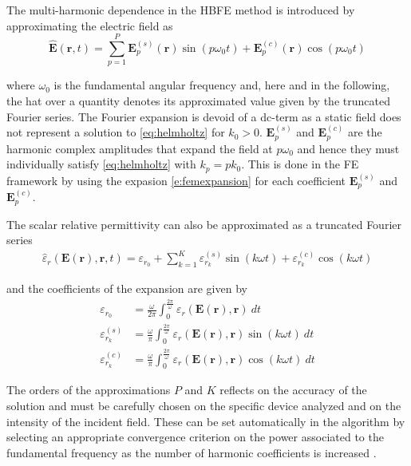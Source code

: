 \documentclass[journal]{IEEEtran}
\renewcommand{\vec}[1]{\mathbf{#1}}
\begin{document}

The multi-harmonic dependence in the HBFE method is introduced by approximating
the electric field as \cite{Bachinger2005}
%
\begin{equation} \label{eq:field}
\vec{\hat{E}}(\vec{r}, t) = \sum^P_{p=1} \vec{E}_{p}^{(s)}(\vec{r}) \sin(p
\omega_0 t) + \vec{E}_p^{(c)}(\vec{r}) \cos(p \omega_0 t)
\end{equation} 

\noindent where $\omega_0$ is the fundamental angular frequency and, here and in
the following, the hat over a quantity denotes its approximated value given by
the truncated Fourier series. The Fourier expansion is devoid of a dc-term as a
static field does not represent a solution to \eqref{eq:helmholtz} for $k_0 >
0$. $\vec{E}_{p}^{(s)}$ and $\vec{E}_{p}^{(c)}$ are the harmonic complex
amplitudes that expand the field at $p\omega_0$ and hence they must individually
satisfy \eqref{eq:helmholtz} with $k_p=pk_0$. This is done in the FE framework
by using the expasion \eqref{e:femexpansion} for each coefficient $\vec{E}_{p}^{(s)}$ and
$\vec{E}_{p}^{(c)}$.

The scalar relative permittivity can also be approximated as a truncated Fourier series 
%
\begin{eqnarray} \label{eq:eps}
\hat{{\varepsilon}}_r(\vec{E}(\vec{r}), \vec{r}, t) = {\varepsilon}_{r_0} + \sum^K_{k=1} {\varepsilon}_{r_k}^{(s)} \sin(k \omega t) + {\varepsilon}_{r_k}^{(c)} \cos(k \omega t)
\end{eqnarray} 

\noindent and the coefficients of the expansion are given by
\begin{align} \label{eq:epsCoeffs}
{\varepsilon}_{r_{0}} &=  \frac{\omega}{2\pi}\int_0^{\frac{2\pi}{\omega}}
{\varepsilon}_r(\vec{E}(\vec{r}), \vec{r}) \ dt \nonumber \\
{\varepsilon}_{r_{k}}^{(s)} &=  \frac{\omega}{\pi}\int_0^{\frac{2\pi}{\omega}}
{\varepsilon}_r(\vec{E}(\vec{r}), \vec{r}) \sin(k \omega t) \ dt \\ 
{\varepsilon}_{r_{k}}^{(c)} &=  \frac{\omega}{\pi}\int_0^{\frac{2\pi}{\omega}} 
{\varepsilon}_r(\vec{E}(\vec{r}), \vec{r}) \cos(k \omega t) \ dt
\nonumber 
\end{align} 

The orders of the approximations $P$ and $K$ reflects on the accuracy
of the solution and must be carefully chosen on the specific device
analyzed and on the intensity of the incident field. These can be set
automatically in the algorithm by selecting an appropriate convergence criterion
on the power associated to the fundamental frequency as the number of harmonic
coefficients is increased \cite{Gyselinck2002}.
\end{document}
